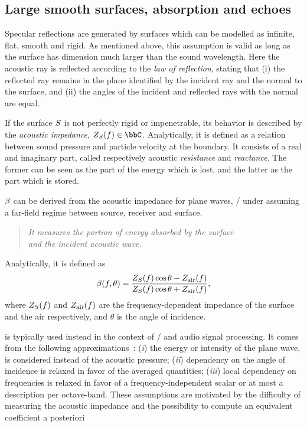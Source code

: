 \subsection{Large smooth surfaces, absorption and echoes}
Specular reflections are generated by surfaces which can be modelled as infinite, flat, smooth and rigid.
As mentioned above, this assumption is valid as long as the surface has dimension much larger than the sound wavelength.
Here the acoustic ray is reflected according to the \textit{law of reflection}, stating that
(i) the reflected ray remains in the plane identified by the incident ray and the normal to the surface,
and (ii) the angles of the incident and reflected rays with the normal are equal.

If the surface $S$ is not perfectly rigid or impenetrable, its behavior is described by the \textit{acoustic impedance}, $\impedence_\surface(f) \in \bbC$.
Analytically, it is defined as a relation between sound pressure and particle velocity at the boundary.
It consists of a real and imaginary part, called respectively acoustic \textit{resistance} and \textit{reactance}.
The former can be seen as the part of the energy which is lost, and the latter as the part which is stored.

 $\beta$ can be derived from the acoustic impedance
for plane waves, \ie/ under assuming a far-field regime between source, receiver and surface.
\begin{quote}
    \textit{It measures the portion of energy absorbed by the surface
    \\and the incident acoustic wave.}
\end{quote}
Analytically, it is defined as  
\begin{equation}
    \beta(f, \theta) = \frac{Z_{S}(f)\cos{\theta} - Z_\text{air}(f)}{Z_{S}(f)\cos{\theta} + Z_\text{air}(f)}
    ,
\end{equation}
where $Z_{S}(f)$ and $Z_\text{air}(f)$ are the frequency-dependent impedance of the surface and the air respectively,
and $\theta$ is the angle of incidence.

 is typically used instead in the context of \GA/ and audio signal processing.
It comes from the following approximations~:
(\textit{i}) the energy or intensity of the plane wave, is considered instead of the acoustic pressure;
(\textit{ii}) dependency on the angle of incidence is relaxed in favor of the averaged quantities;
(\textit{iii}) local dependency on frequencies is relaxed in favor of a frequency-independent scalar or at most a description per octave-band.
These assumptions are motivated by the difficulty of measuring the acoustic impedance
and the possibility to compute an equivalent coefficient a posteriori

